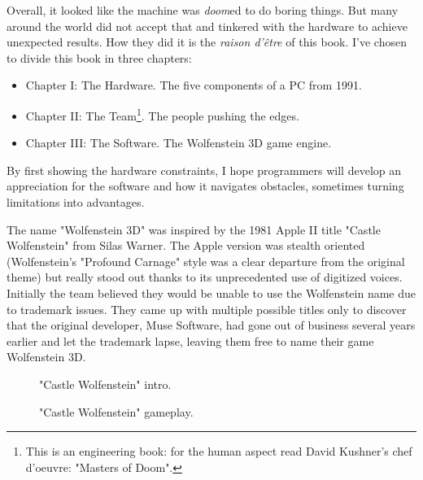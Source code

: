 Overall, it looked like the machine was \emph{doom}ed to do boring things. But many around the world did not accept that and tinkered with the hardware to achieve unexpected results. How they did it is the \textit{raison d'\^etre} of this book. I've chosen to divide this book in three chapters:
\begin{itemize}
\item Chapter I: The Hardware. The five components of a PC from 1991.
\item Chapter II: The Team\footnote{This is an engineering book: for the human aspect read David Kushner's chef d'oeuvre: "Masters of Doom".}. The people pushing the edges.
\item Chapter III: The Software. The Wolfenstein 3D game engine.
\end{itemize}
\par
By first showing the hardware constraints, I hope programmers will develop an appreciation for the software and how it navigates obstacles, sometimes turning limitations into advantages.\\
\par
{} The name "Wolfenstein 3D" was inspired by the 1981 Apple II title "Castle Wolfenstein" from Silas Warner. The Apple version was stealth oriented (Wolfenstein's "Profound Carnage" style was a clear departure from the original theme) but really stood out thanks to its unprecedented use of digitized voices. Initially the team believed they would be unable to use the Wolfenstein name due to trademark issues. They came up with multiple possible titles only to discover that the original developer, Muse Software, had gone out of business several years earlier and let the trademark lapse, leaving them free to name their game Wolfenstein 3D.

\begin{figure}[H]
\centering
{}
\caption{"Castle Wolfenstein" intro.}
\end{figure}

\begin{figure}[H]
\centering
{}
\caption{"Castle Wolfenstein" gameplay.}
\end{figure}
